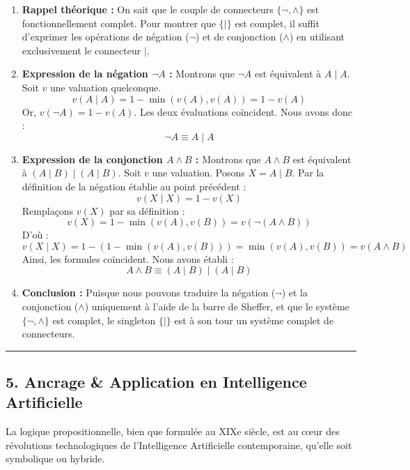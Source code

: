 \documentclass[11pt,a4paper]{article}
\begin{document}
\begin{enumerate}
\def\labelenumi{\arabic{enumi}.}
\item
  \textbf{Rappel théorique :} On sait que le couple de connecteurs
  \(\{\neg, \land\}\) est fonctionnellement complet. Pour montrer que
  \(\{\mid\}\) est complet, il suffit d'exprimer les opérations de
  négation (\(\neg\)) et de conjonction (\(\land\)) en utilisant
  exclusivement le connecteur \(\mid\).
\item
  \textbf{Expression de la négation \(\neg A\) :} Montrons que
  \(\neg A\) est équivalent à \(A \mid A\). Soit \(v\) une valuation
  quelconque. \[v(A \mid A) = 1 - \min(v(A), v(A)) = 1 - v(A)\] Or,
  \(v(\neg A) = 1 - v(A)\). Les deux évaluations coïncident. Nous avons
  donc : \[\neg A \equiv A \mid A\]
\item
  \textbf{Expression de la conjonction \(A \land B\) :} Montrons que
  \(A \land B\) est équivalent à \((A \mid B) \mid (A \mid B)\). Soit
  \(v\) une valuation. Posons \(X = A \mid B\). Par la définition de la
  négation établie au point précédent : \[v(X \mid X) = 1 - v(X)\]
  Remplaçons \(v(X)\) par sa définition :
  \[v(X) = 1 - \min(v(A), v(B)) = v(\neg(A \land B))\] D'où :
  \[v(X \mid X) = 1 - (1 - \min(v(A), v(B))) = \min(v(A), v(B)) = v(A \land B)\]
  Ainsi, les formules coïncident. Nous avons établi :
  \[A \land B \equiv (A \mid B) \mid (A \mid B)\]
\item
  \textbf{Conclusion :} Puisque nous pouvons traduire la négation
  (\(\neg\)) et la conjonction (\(\land\)) uniquement à l'aide de la
  barre de Sheffer, et que le système \(\{\neg, \land\}\) est complet,
  le singleton \(\{\mid\}\) est à son tour un système complet de
  connecteurs.
\end{enumerate}

\begin{center}\rule{0.5\linewidth}{0.5pt}\end{center}

\hypertarget{ancrage-application-en-intelligence-artificielle}{%
\subsection{5. Ancrage \& Application en Intelligence
Artificielle}\label{ancrage-application-en-intelligence-artificielle}}

La logique propositionnelle, bien que formulée au XIXe siècle, est au
cœur des révolutions technologiques de l'Intelligence Artificielle
contemporaine, qu'elle soit symbolique ou hybride.
\end{document}
